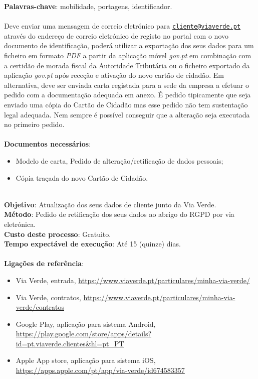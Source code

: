 \textbf{Palavras-chave}: mobilidade, portagens, identificador. \\
\\
Deve enviar uma mensagem de correio eletrónico para
\href{mailto:cliente@viaverde.pt}{\nolinkurl{cliente@viaverde.pt}}
através do endereço de correio eletrónico de registo no portal com o
novo documento de identificação, poderá utilizar a exportação dos seus
dados para um ficheiro em formato \emph{PDF} a partir da aplicação móvel
\emph{gov.pt} em combinação com a certidão de morada fiscal da
Autoridade Tributária ou o ficheiro exportado da aplicação \emph{gov.pt}
após receção e ativação do novo cartão de cidadão. Em alternativa, deve
ser enviada carta registada para a sede da empresa a efetuar o pedido
com a documentação adequada em anexo. É pedido tipicamente que seja
enviado uma cópia do Cartão de Cidadão mas esse pedido não tem
sustentação legal adequada. Nem sempre é possível conseguir que a
alteração seja executada no primeiro pedido. \\
\\
\textbf{Documentos necessários}:
\begin{itemize}
	\item Modelo de carta, Pedido de alteração/retificação de dados pessoais;
	\item Cópia traçada do novo Cartão de Cidadão.
\end{itemize}
\leavevmode\\
\textbf{Objetivo}: Atualização dos seus dados de cliente junto da Via Verde. \\
\textbf{Método}: Pedido de retificação dos seus dados ao abrigo do RGPD por via eletrónica. \\
\textbf{Custo deste processo}: Gratuito. \\
\textbf{Tempo expectável de execução}: Até 15 (quinze) dias. \\
\\
\textbf{Ligações de referência}:
\begin{itemize}
	\item Via Verde, entrada, \url{https://www.viaverde.pt/particulares/minha-via-verde/}
	\item Via Verde, contratos, \url{https://www.viaverde.pt/particulares/minha-via-verde/contratos}
	\item Google Play, aplicação para sistema Android, \url{https://play.google.com/store/apps/details?id=pt.viaverde.clientes\&hl=pt\_PT}
	\item Apple App store, aplicação para sistema iOS, \url{https://apps.apple.com/pt/app/via-verde/id674583357}
\end{itemize}


